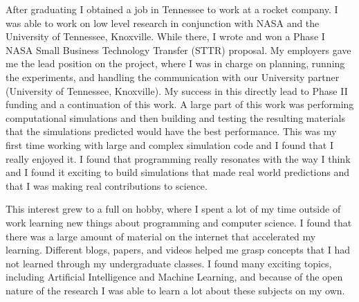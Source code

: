 \documentclass[12pt]{article}
\begin{document}
%
%

After graduating I obtained a job in Tennessee to work at a rocket company.
I was able to work on low level research in conjunction with NASA and the
University of Tennessee, Knoxville. While there, I wrote and won a Phase I NASA
Small Business Technology Transfer (STTR) proposal. My employers gave me the
lead position on the project, where I was in charge on planning, running the
experiments, and handling the communication with our University partner
(University of Tennessee, Knoxville). My success in this directly lead to Phase
II funding and a continuation of this work. A large part of this work was
performing computational simulations and then building and testing the resulting
materials that the simulations predicted would have the best performance. This
was my first time working with large and complex simulation code and I found
that I really enjoyed it. I found that programming really resonates with the way
I think and I found it exciting to build simulations that made real world
predictions and that I was making real contributions to science. 

This interest grew to a full on hobby, where I spent a lot of my time outside of
work learning new things about programming and computer science. I found that
there was a large amount of material on the internet that accelerated my
learning. Different blogs, papers, and videos helped me grasp concepts that I
had not learned through my undergraduate classes. I found many exciting topics,
including Artificial Intelligence and Machine Learning, and because of the open
nature of the research I was able to learn a lot about these subjects on my own.
\end{document}
